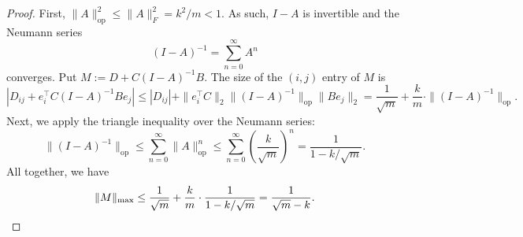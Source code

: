 \documentclass[10pt,a4paper]{amsart}
\begin{document}
\begin{proof}
First, $\|A\|_{\operatorname{op}}^2\leq\|A\|_F^2=k^2/m<1$.
As such, $I-A$ is invertible and the Neumann series
\[
(I-A)^{-1} 
= \sum_{n=0}^\infty A^n
\]
converges.
Put $M:=D+C(I-A)^{-1}B$.
The size of the $(i,j)$ entry of $M$ is
\[
| D_{ij}+e_i^\top C(I-A)^{-1}Be_j |
\leq | D_{ij} | + \|e_i^\top C\|_2 \|(I-A)^{-1}\|_{\operatorname{op}} \|Be_j\|_2
=\frac{1}{\sqrt{m}}+\frac{k}{m}\cdot\|(I-A)^{-1}\|_{\operatorname{op}}.
\]
Next, we apply the triangle inequality over the Neumann series:
\[
\|(I-A)^{-1}\|_{\operatorname{op}}
\leq\sum_{n=0}^\infty \|A\|_{\operatorname{op}}^n
\leq\sum_{n=0}^\infty \left(\frac{k}{\sqrt{m}}\right)^n
=\frac{1}{1-k/\sqrt{m}}.
\]
All together, we have
\[
\|M\|_{\max}
\leq\frac{1}{\sqrt{m}}+\frac{k}{m}\cdot\frac{1}{1-k/\sqrt{m}}
=\frac{1}{\sqrt{m}-k}.
\qedhere
\]
\end{proof}
\end{document}
